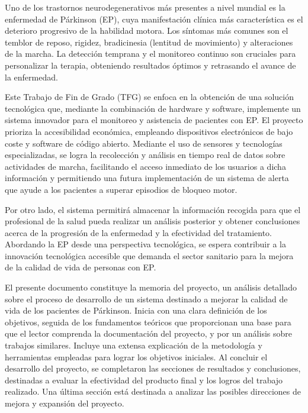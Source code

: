 
Uno de los trastornos neurodegenerativos más presentes a nivel mundial es la enfermedad de Párkinson (EP), cuya manifestación clínica más característica es el deterioro progresivo de la habilidad motora. Los síntomas más comunes son el temblor de reposo, rigidez, bradicinesia (lentitud de movimiento) y alteraciones de la marcha. La detección temprana y el monitoreo continuo son cruciales para personalizar la terapia, obteniendo resultados óptimos y retrasando el avance de la enfermedad. 

Este Trabajo de Fin de Grado (TFG) se enfoca en la obtención de una solución tecnológica que, mediante la combinación de hardware y software, implemente un sistema innovador para el monitoreo y asistencia de pacientes con EP. El proyecto prioriza la accesibilidad económica, empleando dispositivos electrónicos de bajo coste y software de código abierto. Mediante el uso de sensores y tecnologías especializadas, se logra la recolección y análisis en tiempo real de datos sobre actividades de marcha, facilitando el acceso inmediato de los usuarios a dicha información y permitiendo una futura implementación de un sistema de alerta que ayude a los pacientes a superar episodios de bloqueo motor.

Por otro lado, el sistema permitirá almacenar la información recogida para que el profesional de la salud pueda realizar un análisis posterior y obtener conclusiones acerca de la progresión de la enfermedad y la efectividad del tratamiento. Abordando la EP desde una perspectiva tecnológica, se espera contribuir a la innovación tecnológica accesible que demanda el sector sanitario para la mejora de la calidad de vida de personas con EP.

El presente documento constituye la memoria del proyecto, un análisis detallado sobre el proceso de desarrollo de un sistema destinado a mejorar la calidad de vida de los pacientes de Párkinson. Inicia con una clara definición de los objetivos, seguida de los fundamentos teóricos que proporcionan una base para que el lector comprenda la documentación del proyecto, y por un análisis sobre trabajos similares. Incluye una extensa explicación de la metodología y herramientas empleadas para lograr los objetivos iniciales. Al concluir el desarrollo del proyecto, se completaron las secciones de resultados y conclusiones, destinadas a evaluar la efectividad del producto final y los logros del trabajo realizado. Una última sección está destinada a analizar las posibles direcciones de mejora y expansión del proyecto.

